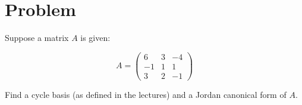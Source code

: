 \documentclass[11pt]{scrartcl}
\begin{document}
\section{Problem}
\begin{problem*}
Suppose a matrix $A$ is given:

\begin{equation*}
  A =
  \begin{pmatrix}
    6 & 3 & -4\\
    -1 & 1 & 1\\
    3 & 2 & -1
  \end{pmatrix}
\end{equation*}

Find a cycle basis (as defined in the lectures) and a Jordan canonical
form of $A$.
\end{problem*}
\end{document}
